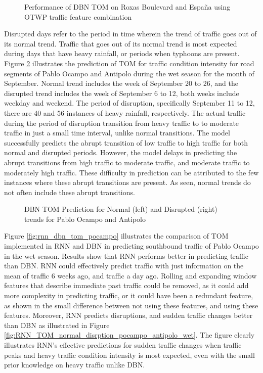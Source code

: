 \begin{figure}[!t]
  \centering
  \captionsetup{justification=centering}
  \caption{Performance of DBN TOM on Roxas Boulevard and España using OTWP traffic feature combination}
  \label{fig:tom_feat_combi_road}
\end{figure}
 

Disrupted days refer to the period in time wherein the trend of traffic goes out of its normal trend. Traffic that goes out of its normal trend is most expected during days that have  heavy rainfall, or periods when typhoons are present. Figure \ref{fig:TOM_normal_disrption_pocampo_antipolo_wet} illustrates the prediction of TOM for traffic condition intensity for road segments of Pablo Ocampo and Antipolo during the wet season for the month of September. Normal trend includes the week of September 20 to 26, and the disrupted trend includes the week of September 6 to 12, both weeks include weekday and weekend. The period of disruption, specifically September 11 to 12, there are 40 and 56 instances of heavy rainfall, respectively. The actual traffic during the period of disruption transition from heavy traffic to to moderate traffic in just a small time interval, unlike normal transitions. The model successfully predicts the abrupt transition of low traffic to high traffic for both normal and disrupted periods. However, the model delays in predicting the abrupt transitions from high traffic to moderate traffic, and moderate traffic to moderately high traffic. These difficulty in prediction can be attributed to the few instances where these abrupt transitions are present. As seen, normal trends do not often include these abrupt transitions. 

\begin{figure}[!t]
  \centering
  \captionsetup{justification=centering}
  \caption{DBN TOM Prediction for Normal (left) and Disrupted (right) trends for Pablo Ocampo and Antipolo}
  \label{fig:TOM_normal_disrption_pocampo_antipolo_wet}
\end{figure}

Figure \ref{fig:rnn_dbn_tom_pocampo} illustrates the comparison of TOM implemented in RNN and DBN in predicting southbound traffic of Pablo Ocampo in the wet season. Results show that RNN performs better in predicting traffic than DBN. RNN could effectively predict traffic with just information on the mean of traffic 6 weeks ago, and traffic a day ago. Rolling and expanding window features that describe immediate past traffic could be removed, as it could add more complexity in predicting traffic, or it could have been a redundant feature, as shown in the small difference between not using these features, and using these features. Moreover, RNN predicts disruptions, and sudden traffic changes better than DBN as illustrated in Figure \ref{fig:RNN_TOM_normal_disrption_pocampo_antipolo_wet}. The figure clearly illustrates RNN's effective predictions for sudden traffic changes when traffic peaks and heavy traffic condition intensity is most expected, even with the small prior knowledge on heavy traffic unlike DBN. 

